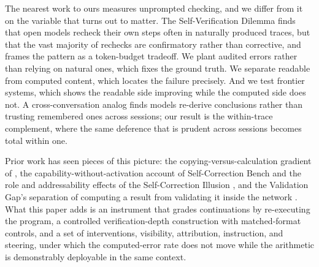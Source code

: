 The nearest work to ours measures unprompted checking, and we differ from it on the variable that turns out to matter. The Self-Verification Dilemma \citep{svd2026} finds that open models recheck their own steps often in naturally produced traces, but that the vast majority of rechecks are confirmatory rather than corrective, and frames the pattern as a token-budget tradeoff. We plant audited errors rather than relying on natural ones, which fixes the ground truth. We separate readable from computed content, which locates the failure precisely. And we test frontier systems, which shows the readable side improving while the computed side does not. A cross-conversation analog \citep{reclaim2026} finds models re-derive conclusions rather than trusting remembered ones across sessions; our result is the within-trace complement, where the same deference that is prudent across sessions becomes total within one.

Prior work has seen pieces of this picture: the copying-versus-calculation gradient of \citet{yee2024faithful}, the capability-without-activation account of Self-Correction Bench and the role and addressability effects of the Self-Correction Illusion \citep{tsui2025,sci2026}, and the Validation Gap's separation of computing a result from validating it inside the network \citep{validationgap2025}. What this paper adds is an instrument that grades continuations by re-executing the program, a controlled verification-depth construction with matched-format controls, and a set of interventions, visibility, attribution, instruction, and steering, under which the computed-error rate does not move while the arithmetic is demonstrably deployable in the same context.

